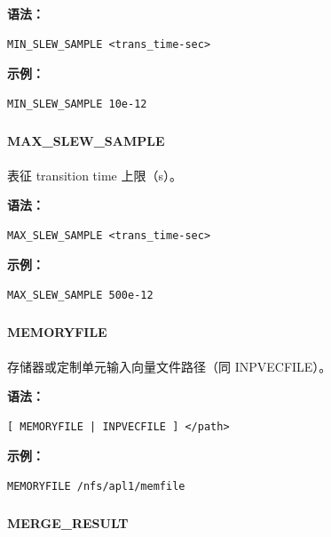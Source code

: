 \textbf{语法：}
\begin{lstlisting}
MIN_SLEW_SAMPLE <trans_time-sec>
\end{lstlisting}

\textbf{示例：}
\begin{lstlisting}
MIN_SLEW_SAMPLE 10e-12
\end{lstlisting}

\subsubsection{}
\paragraph*{MAX_SLEW_SAMPLE}

表征 transition time 上限（s）。

\textbf{语法：}
\begin{lstlisting}
MAX_SLEW_SAMPLE <trans_time-sec>
\end{lstlisting}

\textbf{示例：}
\begin{lstlisting}
MAX_SLEW_SAMPLE 500e-12
\end{lstlisting}

\subsubsection{}
\paragraph*{MEMORYFILE}

存储器或定制单元输入向量文件路径（同 INPVECFILE）。

\textbf{语法：}
\begin{lstlisting}
[ MEMORYFILE | INPVECFILE ] </path>
\end{lstlisting}

\textbf{示例：}
\begin{lstlisting}
MEMORYFILE /nfs/apl1/memfile
\end{lstlisting}

\subsubsection{}
\paragraph*{MERGE_RESULT}

